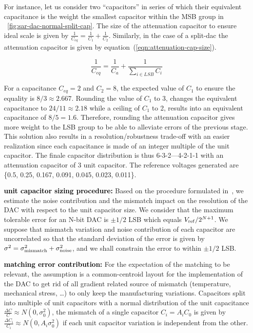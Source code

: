 For instance, let us consider two ``capacitors'' in series of which their equivalent capacitance is the weight the smallest capacitor within the MSB group in \figurename~\ref{fig:sar-dac-normal-split-cap}. The size of the attenuation capacitor to ensure ideal scale is given by \(\frac{1}{C_{eq}} = \frac{1}{C_1}+\frac{1}{C_2}\). Similarly, in the case of a split-dac the attenuation capacitor is given by equation~(\ref{eqn:attenuation-cap-size}).

\begin{equation}
\label{eqn:attenuation-cap-size}
\frac{1}{C_{eq}} = \frac{1}{C_a}+\frac{1}{\sum_{i \in LSB}{C_i}}
\end{equation}

For a capacitance \(C_{eq} = 2 \) and \(C_2 = 8\), the expected value of \(C_1\) to ensure the equality is \(8/3 \approx 2.667 \). Rounding the value of \(C_1\) to 3, changes the equivalent capacitance to \(24/11 \approx 2.18 \) while a ceiling of \(C_1\) to 2, results into an equivalent capacitance of \(8/5 = 1.6 \). Therefore, rounding the attenuation capacitor gives more weight to the LSB group to be able to alleviate errors of the previous stage. This solution also results in a resolution/robustness trade-off with an easier realization since each capacitance is made of an integer multiple of the unit capacitor. The finale capacitor distribution is thus 6-3-2---4-2-1-1 with an attenuation capacitor of 3 unit capacitor. The reference voltages generated are \{0.5, 0.25, 0.167, 0.091, 0.045, 0.023, 0.011\}.

\textbf{\textcolor{black}{unit capacitor sizing procedure:}}
Based on the procedure formulated in~\cite{Yue2013}, we estimate the noise contribution and the mismatch impact on the resolution of the DAC with respect to the unit capacitor size. We consider that the maximum tolerable error for an N-bit DAC is $\pm 1/2$ LSB which equals $V_{\rm ref}/2^{N+1}$. We suppose that mismatch variation and noise contribution of each capacitor are uncorrelated so that the standard deviation of the error is given by $\sigma^2 = \sigma_{\rm mismatch}^2 + \sigma_{\rm noise}^2$, and we shall constrain the error to within $\pm 1/2$ LSB.

\textbf{\textcolor{black}{matching error contribution:}}
For the expectation of the matching to be relevant, the assumption is a common-centroid layout for the implementation of the DAC to get rid of all gradient related source of mismatch (temperature, mechanical stress, \ldots) to only keep the manufacturing variations. Capacitors split into multiple of unit capacitors with a normal distribution of the unit capacitance $\frac{\Delta C}{C} \approx N(0, \sigma_0^2)$, the mismatch of a single capacitor \(C_i = A_iC_0\) is given by $\frac{\Delta C_i}{C_i} \approx N(0, A_i\sigma_0^2)$ if each unit capacitor variation is independent from the other.

